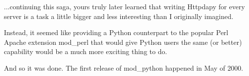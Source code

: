   ...continuing this saga, yours truly later learned that writing
  Httpdapy for every server is a task a little bigger and less
  interesting than I originally imagined.

  Instead, it seemed like providing a Python counterpart to the
  popular Perl Apache extension mod_perl that would give Python users
  the same (or better) capability would be a much more exciting thing
  to do.

  And so it was done. The first release of mod_python happened in May
  of 2000.

